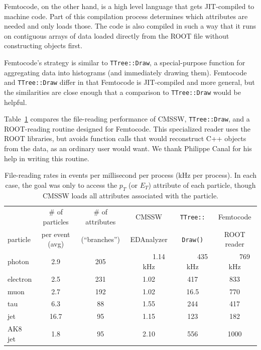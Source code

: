 \documentclass[12pt]{article}
\begin{document}
Femtocode, on the other hand, is a high level language that gets JIT-compiled to machine code. Part of this compilation process determines which attributes are needed and only loads those. The code is also compiled in such a way that it runs on contiguous arrays of data loaded directly from the ROOT file without constructing objects first.

Femtocode's strategy is similar to {\tt TTree::Draw}, a special-purpose function for aggregating data into histograms (and immediately drawing them). Femtocode and {\tt TTree::Draw} differ in that Femtocode is JIT-compiled and more general, but the similarities are close enough that a comparison to {\tt TTree::Draw} would be helpful.

Table~\ref{cmssw-table} compares the file-reading performance of CMSSW, {\tt TTree::Draw}, and a ROOT-reading routine designed for Femtocode. This specialized reader uses the ROOT libraries, but avoids function calls that would reconstruct C++ objects from the data, as an ordinary user would want. We thank Philippe Canal for his help in writing this routine.

\begin{table}
\caption{\label{cmssw-table} File-reading rates in events per millisecond per process (kHz per process). In each case, the goal was only to access the $p_T$ (or $E_T$) attribute of each particle, though CMSSW loads all attributes associated with the particle.}

\begin{center}
\begin{tabular}{l c c c c c}
          &\# of particles & \# of attributes & CMSSW &{\tt TTree::} & Femtocode \\
particle  & per event (avg) & (``branches'') & EDAnalyzer &{\tt Draw()} & ROOT reader \\\hline
photon    & 2.9    & 205         & \mbox{\ \ \ \ \ } 1.14 kHz   &   \mbox{\ \ \ \ \ } 435 kHz       &   \mbox{\ \ \ \ \ } 769 kHz \\
electron  & 2.5     & 231         & 1.02   &   417       &   833        \\
muon      & 2.7     & 192         & 1.02   &   16.5      &   770        \\
tau       & 6.3     &  88         & 1.55   &   244       &   417        \\
jet       & 16.7    &  95         & 1.15   &   123       &   182        \\
AK8 jet   & 1.8     &  95         & 2.10   &   556       &   1000       \\
\end{tabular}
\end{center}
\end{table}
\end{document}
